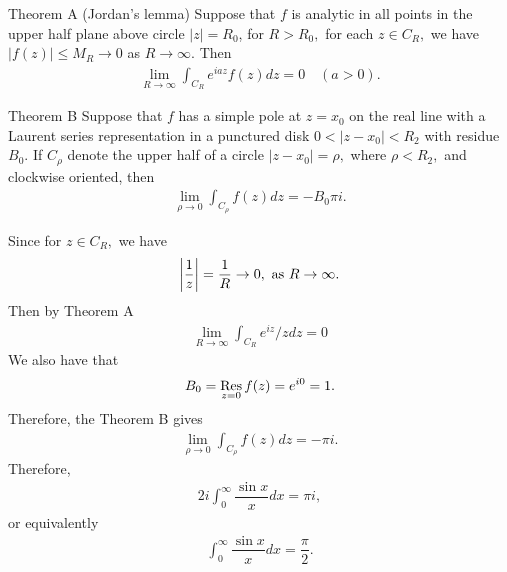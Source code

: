 \begin{problem}
\begin{solution}
\begin{itemize}
\begin{thmbox}{Theorem A (Jordan's lemma)}  Suppose that $f$ is analytic in all points in the upper half plane above circle $|z|=R_0$, for $R>R_0,$ for each $z\in C_R,$ we have $|f(z)|\le M_R\rightarrow 0$ as $R\rightarrow\infty.$ Then 
\begin{align*}
    \lim_{R\rightarrow\infty}\int_{C_R} e^{iaz}f(z)dz=0\quad(a>0).
\end{align*}
\end{thmbox}
\begin{thmbox}{Theorem B}
Suppose that $f$ has a simple pole at $z=x_0$ on the real line with a Laurent series representation in a punctured disk $0<|z-x_0|<R_2$ with residue $B_0.$ If $C_\rho$ denote the upper half of a circle $|z-x_0|=\rho,$ where $\rho<R_2,$ and clockwise oriented, then 
\begin{align*}
\lim_{\rho\rightarrow0}    \int_{C_\rho}f(z)dz=-B_0\pi i.
\end{align*}
\end{thmbox}
Since for $z\in C_R,$ we have \begin{align*}
    \left\lvert \dfrac{1}{z}\right\rvert=\dfrac{1}{R}\rightarrow 0,\text{ as }R\rightarrow \infty.
\end{align*}
Then by Theorem A
\begin{align*}
    \lim_{R\rightarrow\infty}\int_{C_R} e^{iz}/zdz=0
\end{align*}
We also have that 
\begin{align*}
    B_0=\mathop{\rm Res}_{z=0}f(z)=e^{i0}=1.
\end{align*}
Therefore, the Theorem B gives 
\begin{align*}
    \lim_{\rho\rightarrow0}    \int_{C_\rho}f(z)dz=-\pi i.
\end{align*}
Therefore,
\begin{align*}
    2i\int_{0}^\infty \dfrac{\sin x}{x}dx=\pi i,
\end{align*}
or equivalently 
\begin{align*}
    \int_{0}^\infty \dfrac{\sin x}{x}dx=\dfrac{\pi}{2}.
\end{align*}
\end{itemize}
\end{solution}
\end{problem}

